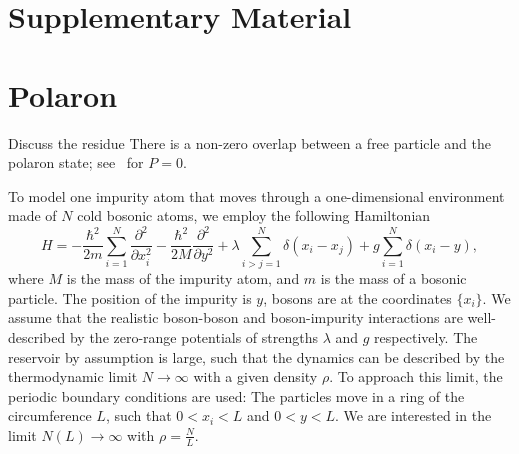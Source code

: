 \documentclass[twocolumn,amsmath,amssymb,showpacs,prl,superscriptaddress,aps]{revtex4-1}
\begin{document}
\widetext

\section{Supplementary Material}

\section{Polaron}

{\color{blue} Discuss the residue} 
There is a non-zero overlap between a free particle and the polaron state; see~\cite{volosniev2017} for $P=0$.

To model one impurity atom that moves through a one-dimensional environment made of $N$ cold bosonic atoms, we employ the following Hamiltonian
\begin{equation}
H=-\frac{\hbar^2}{2m}\sum_{i=1}^N\frac{\partial^2}{\partial x_i^2}-\frac{\hbar^2}{2M}\frac{\partial^2}{\partial y^2}+\lambda \sum_{i>j=1}^N\delta(x_i-x_j)+g \sum_{i=1}^N \delta(x_i-y),
\end{equation}
where $M$ is the mass of the impurity atom, and $m$ is the mass of a bosonic particle. The position of the impurity is $y$, bosons are at the coordinates $\{x_i\}$. 
We assume that the realistic boson-boson and boson-impurity interactions are well-described by the zero-range potentials of strengths $\lambda$ and $g$ respectively. 
The reservoir by assumption is large, such that the dynamics can be described by the thermodynamic limit $N\to \infty$ with a given density $\rho$.
To approach this limit, the periodic boundary conditions are used: The particles move in a ring of the circumference $L$, such that $0<x_i<L$ and $0<y<L$.
We are interested in the limit $N(L)\to \infty$ with $\rho=\frac{N}{L}$.
\end{document}
